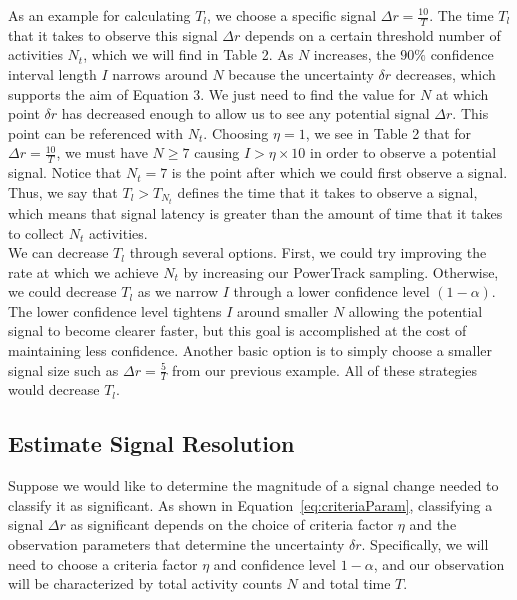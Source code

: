 \documentclass{article}
\begin{document}
As an example for calculating $T_{l}$, we choose a specific signal $\Delta r = \frac{10}{T}$.  The time $T_{l}$ that it takes to observe this signal $\Delta r$ depends on a certain threshold number of activities $N_t$, which we will find in Table 2.  As $N$ increases, the $90\%$ confidence interval length $I$ narrows around $N$ because the uncertainty $\delta r$ decreases, which supports the aim of Equation 3.  We just need to find the value for $N$ at which point $\delta r$ has decreased enough to allow us to see any potential signal $\Delta r$.  
This point can be referenced with $N_t$.  Choosing $\eta=1$, we see in Table 2 that for $\Delta r = \frac{10}{T}$, we must have $N\geq7$ causing $I > \eta \times 10$ in order to observe a potential signal.  Notice that $N_t=7$ is the point after which we could first observe a signal.  Thus, we say that $T_{l}>T_{N_t}$ defines the time that it takes to observe a signal, which means that signal latency is greater than the amount of time that it takes to collect $N_t$ activities.\\

We can decrease $T_{l}$ through several options.  First, we could try improving the rate at which we achieve $N_t$ by  increasing our PowerTrack sampling.  Otherwise, we could decrease $T_{l}$ as we narrow $I$ through a lower confidence level $(1-\alpha)$.  The lower confidence level tightens $I$ around smaller $N$ allowing the potential signal to become clearer faster, but this goal is accomplished at the cost of maintaining less confidence.  Another basic option is to simply choose a smaller signal size such as $\Delta r = \frac{5}{T}$ from our previous example.  All of these strategies would decrease $T_{l}$.





\subsection{Estimate Signal Resolution} %

Suppose we would like to determine the magnitude of a signal change needed to 
classify it as significant. As shown in Equation~\ref{eq:criteriaParam}, 
classifying a signal $\Delta r$ as significant depends on the choice of criteria factor 
$\eta$ and the observation parameters that determine the uncertainty $\delta r$. 
Specifically, we will need to choose a criteria factor $\eta$ and confidence level 
$1-\alpha$, and our observation will be characterized by total activity counts $N$ 
and total time $T$.
\end{document}

